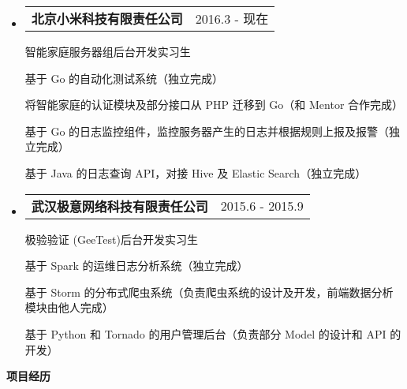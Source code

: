 \documentclass[a4paper,9pt]{article}
\makeatletter
\newcommand{\resheading}[1]{{\large \colorbox{mygrey}{\begin{minipage}{\textwidth}{\textbf{#1 \vphantom{p\^{E}}}}\end{minipage}}}}
\newcommand{\ressubheading}[2]{
  \begin{tabular*}{172mm}{l@{\extracolsep{\fill}}r}
    \textbf{#1} & #2
  \end{tabular*}\vspace{0pt}}
\makeatother
\begin{document}
\begin{itemize}
\item
  \ressubheading{北京小米科技有限责任公司}{2016.3 - 现在}

  \begin{adjustwidth}{8mm}{8mm}

    \textnormal{智能家庭\hspace{6mm}服务器组\hspace{6mm}后台开发实习生}

    \hspace{8mm}\textnormal{基于 Go 的自动化测试系统（独立完成）}
    
    \hspace{8mm}\textnormal{将智能家庭的认证模块及部分接口从 PHP 迁移到 Go（和 Mentor 合作完成）}

    \hspace{8mm}\textnormal{基于 Go 的日志监控组件，监控服务器产生的日志并根据规则上报及报警（独立完成）}

    \hspace{8mm}\textnormal{基于 Java 的日志查询 API，对接 Hive 及 Elastic Search（独立完成）}

  \end{adjustwidth}
  
\item
  \ressubheading{武汉极意网络科技有限责任公司}{2015.6 - 2015.9}

  \begin{adjustwidth}{8mm}{8mm}

    \textnormal{极验验证 (GeeTest)\hspace{6mm}后台开发实习生}

    \hspace{8mm}\textnormal{基于 Spark 的运维日志分析系统（独立完成）}

    \hspace{8mm}\textnormal{基于 Storm 的分布式爬虫系统（负责爬虫系统的设计及开发，前端数据分析模块由他人完成）}

    \hspace{8mm}\textnormal{基于 Python 和 Tornado 的用户管理后台（负责部分 Model 的设计和 API 的开发）}

  \end{adjustwidth}
\end{itemize}

\resheading{项目经历}
\end{document}
